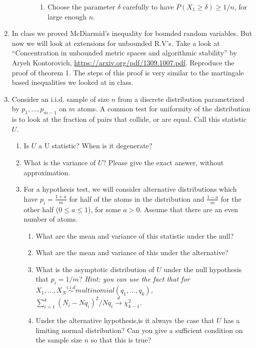 \documentclass[11pt]{article}
\begin{document}
\begin{enumerate}
\begin{enumerate}
\begin{enumerate}
\begin{enumerate}
		\item Choose the parameter $\delta$ carefully to have $P(X_1\geq \delta)\geq 1/n$, for large enough $n$. 
	\end{enumerate}
\end{enumerate}
\end{enumerate}
\item In class we proved McDiarmid's inequality for bounded random variables. But now we will look at extensions for unbounded R.V's. Take a look at ``Concentration in unbounded metric spaces and
algorithmic stability'' by Aryeh Kontorovich,   \url{https://arxiv.org/pdf/1309.1007.pdf}. Reproduce the proof of theorem 1. The steps of this proof is very similar to the martingale based inequalities we looked at in class.
\item Consider an i.i.d. sample of size $n$ from a discrete distribution parametrized by $p_1,\dots, p_{m-1}$  on $m$ atoms. A common test for uniformity of the distribution is to look at the fraction of pairs that collide, or are equal. Call this statistic $U$.
\begin{enumerate}
	\item Is $U$ a U statistic? When is it degenerate?
		\item What is the variance of $U$? Please give the exact answer, without approximation. 
	\item For a hypothesis test, we will consider alternative distributions which have $p_i=\frac{1+a}{m}$ for half of the atoms in the distribution and $\frac{1-a}{m}$ for the other half ($0\le a\le 1$), for some $a>0$. Assume that there are an even number of atoms. %
	\begin{enumerate}
		\item What are the mean and variance of this statistic under the null?
		\item What are the mean and variance of this under the alternative?
		\item What is the asymptotic distribution of $U$ under the null hypothesis that $p_i=1/m$? \textit{Hint: you can use the fact that for $X_1,\dots, X_N\stackrel{i.i.d}{\sim} multinomial(q_1,\dots,q_k)$, $\sum_{i=1}^k (N_i-Nq_i)^2/Nq_i\stackrel{d}{\rightarrow} \chi^2_{k-1}$.}
		\item Under the alternative hypothesis,is it always the case that $U$ has a limiting normal distribution? Can you give a sufficient condition on the sample size $n$ so that this is true? 

\end{enumerate}
\end{enumerate}
\end{enumerate}
\end{document}
